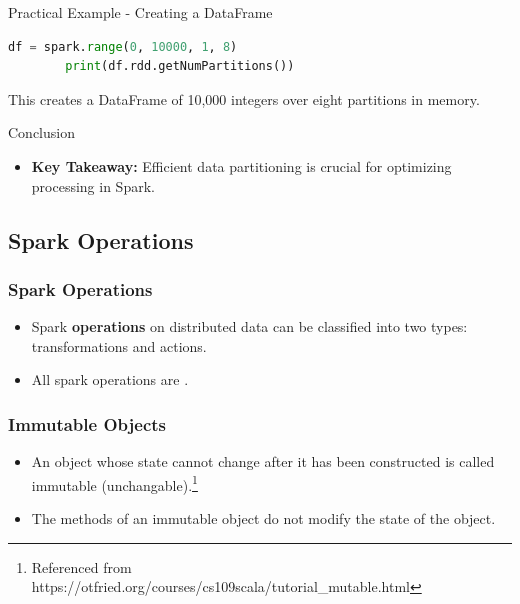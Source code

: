 \begin{frame}[fragile]{Practical Example - Creating a DataFrame}
    \begin{lstlisting}[language=Python,label={lst:pyspark-creating-dataframe}]
        df = spark.range(0, 10000, 1, 8)
        print(df.rdd.getNumPartitions())
    \end{lstlisting}
    This creates a DataFrame of 10,000 integers over eight partitions in memory.
\end{frame}

\begin{frame}{Conclusion}
    \begin{itemize}
        \item \textbf{Key Takeaway:} Efficient data partitioning is crucial for optimizing processing in Spark.
    \end{itemize}
\end{frame}


\subsection{Spark Operations}\label{subsec:spark-operations}
\begin{frame}
    \frametitle{Spark Operations}
    \begin{itemize}
        \item Spark \textbf{operations} on distributed data can be classified into two types: transformations
        and actions.
        \item All spark operations are \texttt{\color{blue}{immutable}}.
    \end{itemize}
\end{frame}
\begin{frame}
    \frametitle{Immutable Objects}
    \begin{itemize}
        \item An object whose state cannot change after it has been constructed is
        called immutable (unchangable).\footnote{Referenced from https://otfried.org/courses/cs109scala/tutorial_mutable.html}
        \item  The methods of an immutable object do not modify the state of the object.
    \end{itemize}
\end{frame}

